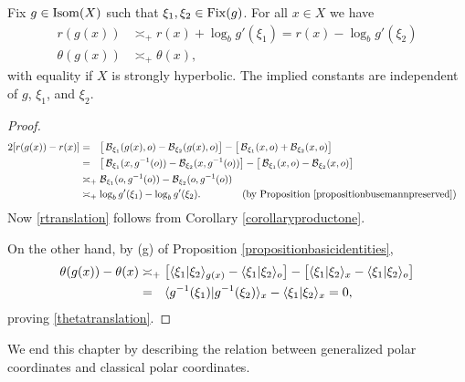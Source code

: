 \begin{lemma}
\label{lemmatranslationdistance}
Fix $g\in \operatorname{Isom}(X)$ such that $\xi_1,\xi_2\in\operatorname{Fix}(g)$. For all $x\in X$ we have
\begin{align} \label{rtranslation}
r(g(x)) &\asymp_\plus r(x) + \log_b g'(\xi_1) = r(x) - \log_b g'(\xi_2)\\ \label{thetatranslation}
\theta(g(x)) &\asymp_\plus \theta(x),
\end{align}
with equality if $X$ is strongly hyperbolic. The implied constants are independent of $g$, $\xi_1$, and $\xi_2$.
\end{lemma}
\begin{proof}
\begin{align*}
2[r(g(x)) - r(x)]
&=_\pt \big[\busemann_{\xi_1}(g(x),\zero) - \busemann_{\xi_2}(g(x),\zero)\big] - \big[\busemann_{\xi_1}(x,\zero) + \busemann_{\xi_2}(x,\zero)\big] \noreason\\
&=_\pt \big[\busemann_{\xi_1}(x,g^{-1}(\zero)) - \busemann_{\xi_2}(x,g^{-1}(\zero))\big] - \big[\busemann_{\xi_1}(x,\zero) - \busemann_{\xi_2}(x,\zero)\big] \noreason\\
&\asymp_\plus \busemann_{\xi_1}(\zero,g^{-1}(\zero)) - \busemann_{\xi_2}(\zero,g^{-1}(\zero))\\
&\asymp_\plus \log_b g'(\xi_1) - \log_b g'(\xi_2). & \by{Proposition \ref{propositionbusemannpreserved}}
\end{align*}
Now \eqref{rtranslation} follows from Corollary \ref{corollaryproductone}.

On the other hand, by (g) of Proposition \ref{propositionbasicidentities},
\begin{align*}
\theta(g(x)) - \theta(x) &\asymp_\plus \big[\lb \xi_1|\xi_2\rb_{g(x)} - \lb \xi_1|\xi_2\rb_\zero\big] - \big[\lb \xi_1|\xi_2\rb_x - \lb \xi_1|\xi_2\rb_\zero\big]\\
&=_\pt \lb g^{-1}(\xi_1)|g^{-1}(\xi_2)\rb_x - \lb \xi_1|\xi_2\rb_x = 0,
\end{align*}
proving \eqref{thetatranslation}.
\end{proof}

%


We end this chapter by describing the relation between generalized polar coordinates and classical polar coordinates.

